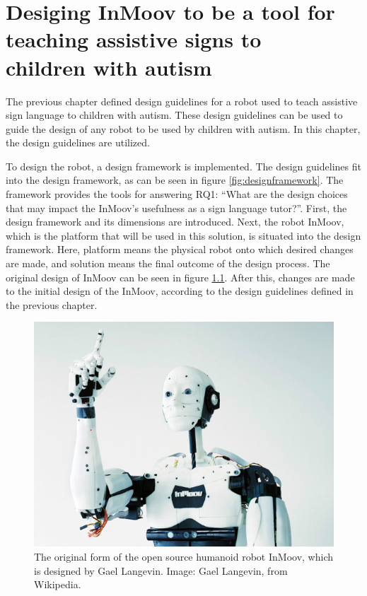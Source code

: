 \chapter[Designing InMoov]{Desiging InMoov to be a tool for teaching assistive signs to \\children with autism}

\label{chapter:design}


The previous chapter defined design guidelines for a robot used to teach assistive sign language to children with autism. These design guidelines can be used to guide the design of any robot to be used by children with autism. In this chapter, the design guidelines are utilized.

To design the robot, a design framework is implemented. The design guidelines fit into the design framework, as can be seen in figure \ref{fig:designframework}. The framework provides the tools for answering RQ1: ``What are the design choices that may impact the InMoov's usefulness as a sign language tutor?''. First, the design framework and its dimensions are introduced. Next, the robot InMoov, which is the platform that will be used in this solution, is situated into the design framework. Here, platform means the physical robot onto which desired changes are made, and solution means the final outcome of the design process. The original design of InMoov can be seen in figure \ref{fig:inmoov}. After this, changes are made to the initial design of the InMoov, according to the design guidelines defined in the previous chapter. 

\begin{figure}
\centering
  \includegraphics[scale=0.5]{images/Inmoov.jpg}
  \caption{The original form of the open source humanoid robot InMoov, which is designed by Gael Langevin. Image: Gael Langevin, from Wikipedia.}
  \label{fig:inmoov}
\end{figure}



